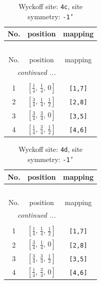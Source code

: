 \documentclass[fleqn,8pt]{jsarticle}
\begin{document}
\renewcommand{\arraystretch}{1.2}
\begin{longtable}{ccc}
\caption{Wyckoff site: {\tt 4c}, site symmetry: {\tt -1'}}
 \\
 \hline \hline
No. & position & mapping \\ \hline \endfirsthead

\multicolumn{2}{l}{\tablename\ \thetable{}} \\
 \hline \hline
No. & position & mapping \\ \hline \endhead

 \hline \hline
\multicolumn{2}{r}{\footnotesize\it continued ...} \\ \endfoot

 \hline \hline
\multicolumn{2}{r}{} \\ \endlastfoot

1 & $\left[ \frac{1}{4},\, \frac{1}{4},\, 0 \right]$ & {\tt [1,7]} \\ \hline
2 & $\left[ \frac{3}{4},\, \frac{1}{4},\, \frac{1}{2} \right]$ & {\tt [2,8]} \\ \hline
3 & $\left[ \frac{3}{4},\, \frac{3}{4},\, 0 \right]$ & {\tt [3,5]} \\ \hline
4 & $\left[ \frac{1}{4},\, \frac{3}{4},\, \frac{1}{2} \right]$ & {\tt [4,6]} \\
\end{longtable}
\renewcommand{\arraystretch}{1.2}
\begin{longtable}{ccc}
\caption{Wyckoff site: {\tt 4d}, site symmetry: {\tt -1'}}
 \\
 \hline \hline
No. & position & mapping \\ \hline \endfirsthead

\multicolumn{2}{l}{\tablename\ \thetable{}} \\
 \hline \hline
No. & position & mapping \\ \hline \endhead

 \hline \hline
\multicolumn{2}{r}{\footnotesize\it continued ...} \\ \endfoot

 \hline \hline
\multicolumn{2}{r}{} \\ \endlastfoot

1 & $\left[ \frac{1}{4},\, \frac{1}{4},\, \frac{1}{2} \right]$ & {\tt [1,7]} \\ \hline
2 & $\left[ \frac{3}{4},\, \frac{1}{4},\, 0 \right]$ & {\tt [2,8]} \\ \hline
3 & $\left[ \frac{3}{4},\, \frac{3}{4},\, \frac{1}{2} \right]$ & {\tt [3,5]} \\ \hline
4 & $\left[ \frac{1}{4},\, \frac{3}{4},\, 0 \right]$ & {\tt [4,6]} \\
\end{longtable}
\end{document}

